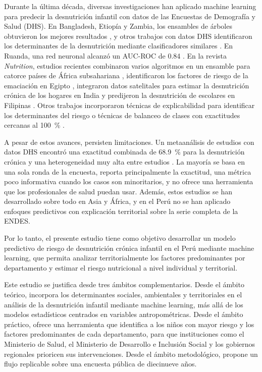 \documentclass[final,5p,times,twocolumn,number,lefttitle]{elsarticle}
\begin{document}
Durante la última década, diversas investigaciones han aplicado machine learning para predecir la desnutrición infantil con datos de las Encuestas de Demografía y Salud (DHS). En Bangladesh, Etiopía y Zambia, los ensambles de árboles obtuvieron los mejores resultados \citep{talukder2020bangladesh,bitew2021ethiopia,chilyabanyama2022zambia}, y otros trabajos con datos DHS identificaron los determinantes de la desnutrición mediante clasificadores similares \citep{fenta2021determinants,anku2024undernutrition}. En Ruanda, una red neuronal alcanzó un AUC-ROC de 0.84 \citep{ndagijimana2025rwanda}. En la revista \textit{Nutrition}, estudios recientes combinaron varios algoritmos en un ensamble para catorce países de África subsahariana \citep{khan2023hybrid}, identificaron los factores de riesgo de la emaciación en Egipto \citep{hendy2025egypt}, integraron datos satelitales para estimar la desnutrición crónica de los hogares en India \citep{arya2025india} y predijeron la desnutrición de escolares en Filipinas \citep{siy2022philippines}. Otros trabajos incorporaron técnicas de explicabilidad para identificar los determinantes del riesgo \citep{yehuala2026xai} o técnicas de balanceo de clases con exactitudes cercanas al 100~\% \citep{mgomezulu2025malawi}.

A pesar de estos avances, persisten limitaciones. Un metaanálisis de estudios con datos DHS encontró una exactitud combinada de 68.9~\% para la desnutrición crónica y una heterogeneidad muy alta entre estudios \citep{rao2025metaanalysis}. La mayoría se basa en una sola ronda de la encuesta, reporta principalmente la exactitud, una métrica poco informativa cuando los casos son minoritarios, y no ofrece una herramienta que los profesionales de salud puedan usar. Además, estos estudios se han desarrollado sobre todo en Asia y África, y en el Perú no se han aplicado enfoques predictivos con explicación territorial sobre la serie completa de la ENDES.

Por lo tanto, el presente estudio tiene como objetivo desarrollar un modelo predictivo de riesgo de desnutrición crónica infantil en el Perú mediante machine learning, que permita analizar territorialmente los factores predominantes por departamento y estimar el riesgo nutricional a nivel individual y territorial.

Este estudio se justifica desde tres ámbitos complementarios. Desde el ámbito teórico, incorpora los determinantes sociales, ambientales y territoriales en el análisis de la desnutrición infantil mediante machine learning, más allá de los modelos estadísticos centrados en variables antropométricas. Desde el ámbito práctico, ofrece una herramienta que identifica a los niños con mayor riesgo y los factores predominantes de cada departamento, para que instituciones como el Ministerio de Salud, el Ministerio de Desarrollo e Inclusión Social y los gobiernos regionales prioricen sus intervenciones. Desde el ámbito metodológico, propone un flujo replicable sobre una encuesta pública de diecinueve años.
\end{document}
